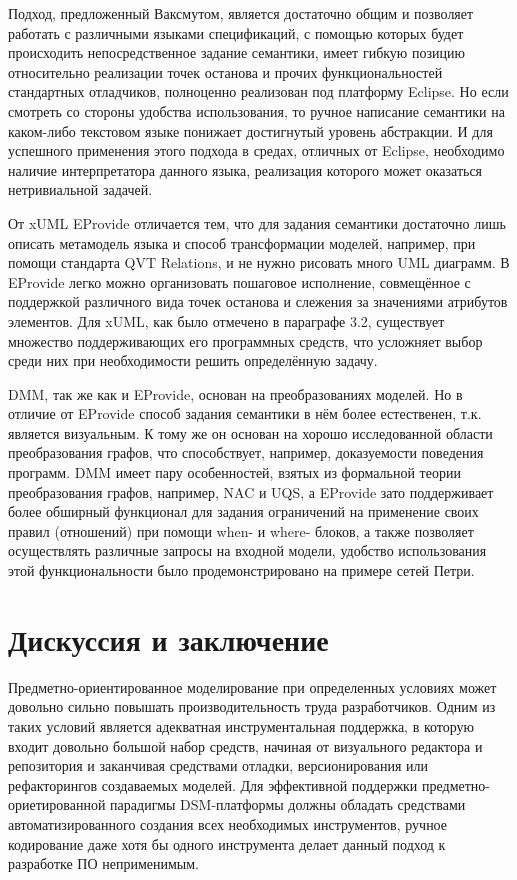 \documentclass[a5paper]{article}
\begin{document}
Подход, предложенный Ваксмутом, является достаточно общим и позволяет работать с различными языками спецификаций, с помощью которых будет происходить непосредственное задание семантики, имеет гибкую позицию относительно реализации точек останова и прочих функциональностей стандартных отладчиков, полноценно реализован под платформу Eclipse. Но если смотреть со стороны удобства использования, то ручное написание семантики на каком-либо текстовом языке понижает достигнутый уровень абстракции. И для успешного применения этого подхода в средах, отличных от Eclipse, необходимо наличие интерпретатора данного языка, реализация которого может оказаться нетривиальной задачей.

От xUML EProvide отличается тем, что для задания семантики достаточно лишь описать метамодель языка и способ трансформации моделей, например, при помощи стандарта QVT Relations, и не нужно рисовать много UML диаграмм. В EProvide легко можно организовать пошаговое исполнение, совмещённое с поддержкой различного вида точек останова и слежения за значениями атрибутов элементов. Для xUML, как было отмечено в параграфе 3.2, существует множество поддерживающих его программных средств, что усложняет выбор среди них при необходимости решить определённую задачу.

DMM, так же как и EProvide, основан на преобразованиях моделей. Но в отличие от EProvide способ задания семантики в нём более естественен, т.к. является визуальным. К тому же он основан на хорошо исследованной области преобразования графов, что способствует, например, доказуемости поведения программ. DMM имеет пару особенностей, взятых из формальной теории преобразования графов, например, NAC и UQS, а EProvide зато поддерживает более обширный функционал для задания ограничений на применение своих правил (отношений) при помощи when- и where- блоков, а также позволяет осуществлять различные запросы на входной модели, удобство использования этой функциональности было продемонстрировано на примере сетей Петри.

\section*{Дискуссия и заключение}

Предметно-ориентированное моделирование при определенных условиях может довольно сильно повышать производительность труда разработчиков. Одним из таких условий является адекватная инструментальная поддержка, в которую входит довольно большой набор средств, начиная от визуального редактора и репозитория и заканчивая средствами отладки, версионирования или рефакторингов создаваемых моделей. Для эффективной поддержки предметно-ориетированной парадигмы DSM-платформы должны обладать средствами автоматизированного создания всех необходимых инструментов, ручное кодирование даже хотя бы одного инструмента делает данный подход к разработке ПО неприменимым.
\end{document}
